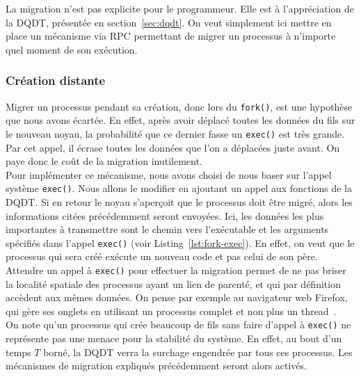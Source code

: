         La migration n'est pas explicite pour le programmeur. Elle est à
        l'appréciation de la DQDT, présentée en section~\ref{sec:dqdt}. On veut
        simplement ici mettre en place un mécanisme via RPC permettant de migrer
        un processus à n'importe quel moment de son exécution.

      \subsubsection{Création distante}

        Migrer un processus pendant sa création, donc lors du \texttt{fork()},
        est une hypothèse que nous avons écartée. En effet, après avoir déplacé
        toutes les données du fils sur le nouveau noyau, la probabilité que ce
        dernier fasse un \texttt{exec()} est très grande. Par cet appel, il
        écrase toutes les données que l'on a déplacées juste avant. On paye donc
        le coût de la migration inutilement.\\

        Pour implémenter ce mécanisme, nous avons choisi de nous baser sur
        l'appel système \texttt{exec()}. Nous allons le modifier en ajoutant un
        appel aux fonctions de la DQDT. Si en retour le noyau s'aperçoit que le
        processus doit être migré, alors les informations citées précédemment
        seront envoyées. Ici, les données les plus importantes à transmettre
        sont le chemin vers l'exécutable et les arguments spécifiés dans l'appel
        \texttt{exec()} (voir Listing~\ref{lst:fork-exec}). En effet, on veut
        que le processus qui sera créé exécute un nouveau code et pas celui de
        son père.\\

        Attendre un appel à \texttt{exec()} pour effectuer la migration permet
        de ne pas briser la localité spatiale des processus ayant un lien de
        parenté, et qui par définition accèdent aux mêmes données. On pense par
        exemple au navigateur web Firefox, qui gère ses onglets en utilisant un
        processus complet et non plus un thread~\citep{mozillaElectrolysis}.\\

        On note qu'un processus qui crée beaucoup de fils sans faire d'appel à
        \texttt{exec()} ne représente pas une menace pour la stabilité du
        système. En effet, au bout d'un temps $T$ borné, la DQDT verra la
        surchage engendrée par tous ces processus. Les mécanismes de migration
        expliqués précédemment seront alors activés.

